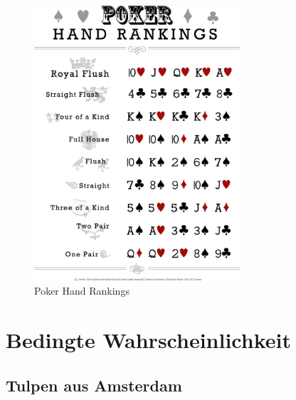 \documentclass[%
11pt,%
twoside,%
titlepage,%
german,%
headsepline%
]{scrartcl}
\begin{document}
\begin{figure}
\centering
\includegraphics[width=0.682\textwidth]{pictures/PokerHandRankings.png}
\caption{Poker Hand Rankings}
\end{figure}

\clearpage

\section{Bedingte Wahrscheinlichkeit}
\subsection{Tulpen aus Amsterdam}
\end{document}

